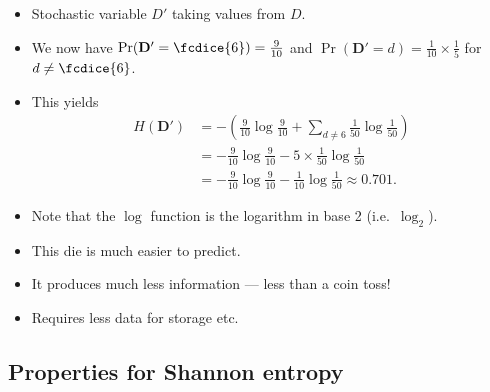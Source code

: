 \documentclass{beamer}
\let\stoch\mathbf{}
\begin{document}
\begin{frame}
  \begin{example}
    \begin{itemize}
      \item Stochastic variable \(D'\) taking values from \(D\).
      \item We now have \(\Pr(\stoch D' = \fcdice{6}) = \frac{9}{10}\) and 
        \(\Pr(\stoch D' = d) = \frac{1}{10}\times\frac{1}{5}\) for \(d\neq 
          \fcdice{6}\).
      \item This yields
        \begin{align*}
          H(\stoch D') &= -\left( \frac{9}{10}\log\frac{9}{10} + \sum_{d\neq 6} 
            \frac{1}{50}\log\frac{1}{50} \right) \\
          &= -\frac{9}{10}\log\frac{9}{10} -5\times\frac{1}{50}\log\frac{1}{50} 
          \\
          &= -\frac{9}{10}\log\frac{9}{10} -\frac{1}{10}\log\frac{1}{50} 
          \approx 0.701.
        \end{align*}
      \item Note that the \(\log\) function is the logarithm in base 2 (i.e.\ 
        \(\log_2\)).
    \end{itemize}
  \end{example}
\end{frame}

\begin{frame}
  \begin{remark}
    \begin{itemize}
      \item This die is much easier to predict.
      \item It produces much less information --- less than a coin toss!
      \item Requires less data for storage etc.
    \end{itemize}
  \end{remark}
\end{frame}

\subsection{Properties for Shannon entropy}
\end{document}
